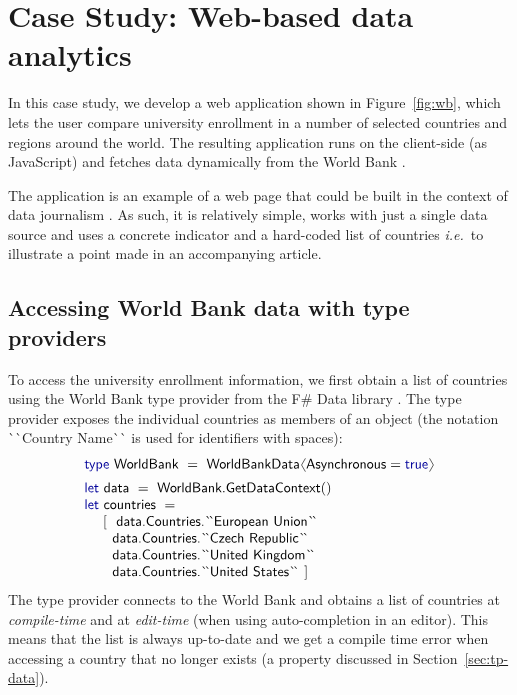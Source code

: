 \documentclass[submission,copyright,creativecommons]{eptcs}
\newcommand{\langl}{\begin{picture}(4.5,7)
\put(1.1,2.5){\rotatebox{60}{\line(1,0){5.5}}}
\put(1.1,2.5){\rotatebox{300}{\line(1,0){5.5}}}
\end{picture}}
\newcommand{\rangl}{\begin{picture}(4.5,7)
\put(.9,2.5){\rotatebox{120}{\line(1,0){5.5}}}
\put(.9,2.5){\rotatebox{240}{\line(1,0){5.5}}}
\end{picture}}
\newcommand{\kvd}[1]{\textnormal{\textcolor{kvdclr}{\sffamily #1}}}
\newcommand{\ident}[1]{\textnormal{\sffamily #1}}
\newcommand{\lident}[1]{\textnormal{\sffamily
  \`{}\hspace{-0.25em}\`{}\hspace{-0.1em}#1\`{}\hspace{-0.25em}\`{}}}
\begin{document}
\section{Case Study: Web-based data analytics}
\label{sec:case}
In this case study, we develop a web application shown in Figure~\ref{fig:wb}, which lets the
user compare university enrollment in a number of selected countries and regions around the world.
The resulting application runs on the client-side (as JavaScript) and fetches data dynamically
from the World Bank \cite{data-wb-schter}.

The application is an example of a web page that could be built in the context of data journalism
\cite{dj-handbook}. As such, it is relatively simple, works with just a single data source and
uses a concrete indicator and a hard-coded list of countries \emph{i.e.}~to illustrate a point
made in an accompanying article.


\subsection{Accessing World Bank data with type providers}

To access the university enrollment information, we first obtain a list of countries using the
World Bank type provider from the F\# Data library \cite{fsharp-data}. The type provider exposes
the individual countries as members of an object (the notation \lident{Country Name} is used for
identifiers with spaces):
%
\begin{equation*}
\begin{array}{l}
 \kvd{type}~\ident{WorldBank}~=~\ident{WorldBankData}\langl\ident{Asynchronous}=\kvd{true}\rangl
 \\[0.5em]
 \kvd{let}~\ident{data}~=~\ident{WorldBank.GetDataContext}() \\
 \kvd{let}~\ident{countries}~= \\
 \quad~\lbrack~~ \ident{data.Countries.}\lident{European Union} \\
 \qquad   \ident{data.Countries.}\lident{Czech Republic} \\
 \qquad   \ident{data.Countries.}\lident{United Kingdom} \\
 \qquad   \ident{data.Countries.}\lident{United States} ~\rbrack
\end{array}
\end{equation*}
%
The type provider connects to the World Bank and obtains a list of countries at
\emph{compile-time} and at \emph{edit-time} (when using auto-completion in an editor).
This means that the list is always up-to-date and we get a compile time error when accessing
a country that no longer exists (a property discussed in Section~\ref{sec:tp-data}).
\end{document}
